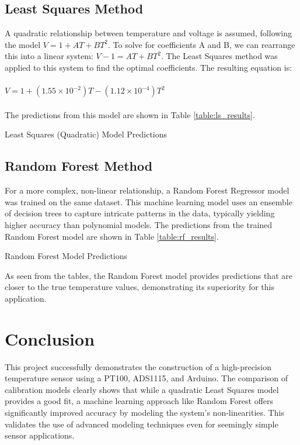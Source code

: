 \documentclass[conference]{IEEEtran}
\begin{document}
\subsection{Least Squares Method}
A quadratic relationship between temperature and voltage is assumed, following the model $V = 1 + AT + BT^2$. To solve for coefficients A and B, we can rearrange this into a linear system: $V - 1 = AT + BT^2$. The Least Squares method was applied to this system to find the optimal coefficients. The resulting equation is:
\\
\\
$V = 1 + (1.55 \times 10^{-2})T - (1.12 \times 10^{-4})T^2$
\\
\\
The predictions from this model are shown in Table \ref{table:ls_results}.

\begin{table}[!h]
  \centering
  \caption{Least Squares (Quadratic) Model Predictions}
  \label{table:ls_results}
  
\end{table}

\subsection{Random Forest Method}
For a more complex, non-linear relationship, a Random Forest Regressor model was trained on the same dataset. This machine learning model uses an ensemble of decision trees to capture intricate patterns in the data, typically yielding higher accuracy than polynomial models. The predictions from the trained Random Forest model are shown in Table \ref{table:rf_results}.

\begin{table}[!h]
  \centering
  \caption{Random Forest Model Predictions}
  \label{table:rf_results}
  
\end{table}

As seen from the tables, the Random Forest model provides predictions that are closer to the true temperature values, demonstrating its superiority for this application.

\section{Conclusion}
This project successfully demonstrates the construction of a high-precision temperature sensor using a PT100, ADS1115, and Arduino. The comparison of calibration models clearly shows that while a quadratic Least Squares model provides a good fit, a machine learning approach like Random Forest offers significantly improved accuracy by modeling the system's non-linearities. This validates the use of advanced modeling techniques even for seemingly simple sensor applications.

%
\end{document}
